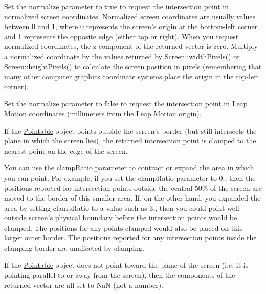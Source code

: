 Set the normalize parameter to true to request the intersection point in normalized screen coordinates. Normalized screen coordinates are usually values between 0 and 1, where 0 represents the screen's origin at the bottom-\/left corner and 1 represents the opposite edge (either top or right). When you request normalized coordinates, the z-\/component of the returned vector is zero. Multiply a normalized coordinate by the values returned by \hyperlink{class_leap_1_1_screen_a183e75cf160db9dfa9653c0f128adac0}{Screen\+::width\+Pixels()} or \hyperlink{class_leap_1_1_screen_a73ec00f33fe7aee01e2a63de06311d79}{Screen\+::height\+Pixels()} to calculate the screen position in pixels (remembering that many other computer graphics coordinate systems place the origin in the top-\/left corner).

Set the normalize parameter to false to request the intersection point in Leap Motion coordinates (millimeters from the Leap Motion origin).

If the \hyperlink{class_leap_1_1_pointable}{Pointable} object points outside the screen's border (but still intersects the plane in which the screen lies), the returned intersection point is clamped to the nearest point on the edge of the screen.

You can use the clamp\+Ratio parameter to contract or expand the area in which you can point. For example, if you set the clamp\+Ratio parameter to 0., then the positions reported for intersection points outside the central 50\% of the screen are moved to the border of this smaller area. If, on the other hand, you expanded the area by setting clamp\+Ratio to a value such as 3., then you could point well outside screen's physical boundary before the intersection points would be clamped. The positions for any points clamped would also be placed on this larger outer border. The positions reported for any intersection points inside the clamping border are unaffected by clamping.


\begin{DoxyCodeInclude}
\end{DoxyCodeInclude}


If the \hyperlink{class_leap_1_1_pointable}{Pointable} object does not point toward the plane of the screen (i.\+e. it is pointing parallel to or away from the screen), then the components of the returned vector are all set to Na\+N (not-\/a-\/number).


